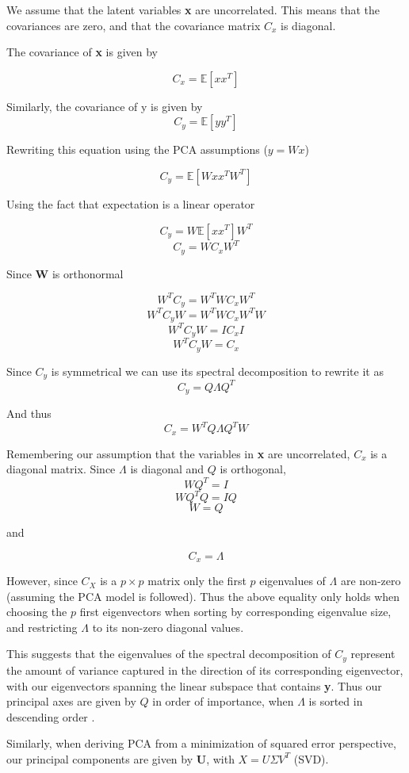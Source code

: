\documentclass[11pt,a4paper,landscape]{article}
\begin{document}
We assume that the latent variables \textbf{x} are uncorrelated. This means that the covariances are zero, and that the covariance matrix $C_{x} $ is diagonal.

The covariance of \textbf{x} is given by

$$ C_{x} = \mathbb{E}[xx^{T}] $$

Similarly, the covariance of y is given by 
$$ C_{y} = \mathbb{E}[yy^{T}] $$

Rewriting this equation using the PCA assumptions ($y = Wx$)

$$ C_{y} = \mathbb{E}[Wxx^{T}W^{T}] $$

Using the fact that expectation is a linear operator

$$ C_{y} = W\mathbb{E}[xx^{T}]W^{T}$$
$$ C_{y} = WC_{x}W^{T}$$

Since \textbf{W} is orthonormal

$$ W^{T}C_{y} = W^{T}WC_{x}W^{T}$$
$$ W^{T}C_{y}W = W^{T}WC_{x}W^{T}W$$
$$ W^{T}C_{y}W = IC_{x}I$$
$$ W^{T}C_{y}W = C_{x}$$

Since $ C_{y} $ is symmetrical we can use its spectral decomposition to rewrite it as
$$ C_{y} = Q\Lambda Q^{T} $$

And thus
$$C_{x} = W^{T}Q\Lambda Q^{T}W$$

Remembering our assumption that the variables in \textbf{x} are uncorrelated,  $C_{x}$ is a diagonal matrix. Since $\Lambda$ is diagonal and $Q$ is orthogonal, 
$$WQ^{T} = I$$
$$WQ^{T}Q=IQ$$
$$W= Q$$

and

$$ C_{x} = \Lambda $$

However, since $C_{X}$ is a $p\times p$ matrix only the first $p$ eigenvalues of $\Lambda$ are non-zero (assuming the PCA model is followed). Thus the above equality only holds when choosing the $p$ first eigenvectors when sorting by corresponding eigenvalue size, and restricting $\Lambda$ to its non-zero diagonal values. \newline

This suggests that the eigenvalues of the spectral decomposition of $C_{y}$ represent the amount of variance captured in the direction of its corresponding eigenvector, with our eigenvectors spanning the linear subspace that contains \textbf{y}. Thus our principal axes are given by $Q$ in order of importance, when $\Lambda$ is sorted in descending order \cite{book}.\newline

Similarly, when deriving PCA from a minimization of squared error perspective, our principal components are given by \textbf{U}, with $X = U\Sigma V^{T}$ (SVD).\newline  
\end{document}
